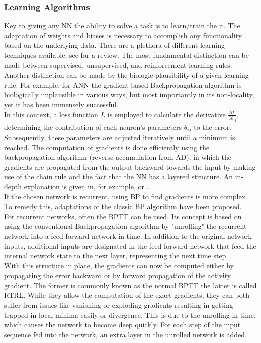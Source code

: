 \subsubsection{Learning Algorithms}
Key to giving any \ac{NN} the ability to solve a task is to learn/train the it. The adaptation of weights and biases is necessary to accomplish any functionality based on the underlying data\cite{zheng_introductory_2022}. There are a plethora of different learning techniques available; see \cite{abdolrasol_artificial_2021,sun_survey_2019} for a review. The most fundamental distinction can be made between supervised, unsupervised, and reinforcement learning rules. Another distinction can be made by the biologic plausibility of a given learning rule. For example, for \ac{ANN} the gradient based Backpropagation algorithm is biologically implausible in various ways, but most importantly in its non-locality, yet it has been immensely successful.\\
In this context, a loss function $L$ is employed to calculate the derivative $\frac{\partial L}{\partial \theta_{ij}}$, determining the contribution of each neuron's parameters $\theta_{ij}$ to the error. Subsequently, these parameters are adjusted iteratively until a minimum is reached. The computation of gradients is done efficiently using the backpropagation algorithm (reverse accumulation from \ac{AD}), in which the gradients are propagated from the output backward towards the input by making use of the chain rule and the fact that the \ac{NN} has a layered structure. An in-depth explanation is given in, for example, \cite{goodfellow_deep_2016} or \cite{nielsen_neural_2015}.\\
If the chosen network is recurrent, using \ac{BP} to find gradients is more complex. To remedy this, adaptations of the classic \ac{BP} algorithm have been proposed.\\
For recurrent networks, often the \ac{BPTT} can be used. Its concept is based on using the conventional Backpropagation algorithm by "unrolling" the recurrent network into a feed-forward network in time. In addition to the original network inputs, additional inputs are designated in the feed-forward network that feed the internal network state to the next layer, representing the next time step.\\
With this structure in place, the gradients can now be computed either by propagating the error backward or by forward propagation of the activity gradient. The former is commonly known as the normal \ac{BPTT} the latter is called \ac{RTRL}\cite{williams_gradient-based_1995}. While they allow the computation of the exact gradients, they can both suffer from issues like vanishing or exploding gradients \cite{pascanu_difficulty_2013,bengio_learning_1994} resulting in getting trapped in local minima easily or divergence. This is due to the unrolling in time, which causes the network to become deep quickly. For each step of the input sequence fed into the network, an extra layer in the unrolled network is added.\\
